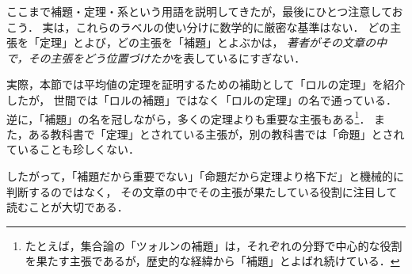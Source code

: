 ここまで補題・定理・系という用語を説明してきたが，最後にひとつ注意しておこう．
実は，これらのラベルの使い分けに数学的に厳密な基準はない．
どの主張を「定理」とよび，どの主張を「補題」とよぶかは，
\emph{著者がその文章の中で，その主張をどう位置づけたか}を表しているにすぎない．
 
実際，本節では平均値の定理を証明するための補助として「ロルの定理」を紹介したが，
世間では「ロルの補題」ではなく「ロルの定理」の名で通っている．
逆に，「補題」の名を冠しながら，多くの定理よりも重要な主張もある\footnote{たとえば，集合論の「ツォルンの補題」は，それぞれの分野で中心的な役割を果たす主張であるが，歴史的な経緯から「補題」とよばれ続けている．}．
また，ある教科書で「定理」とされている主張が，別の教科書では「命題」とされていることも珍しくない．
 
したがって，「補題だから重要でない」「命題だから定理より格下だ」と機械的に判断するのではなく，
その文章の中でその主張が果たしている役割に注目して読むことが大切である．


